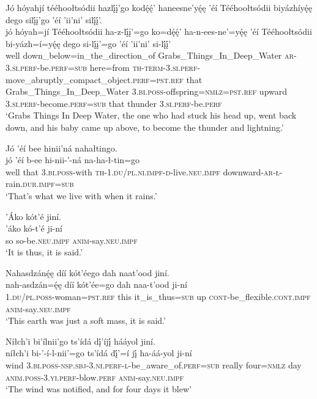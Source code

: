 \ea\label{ex:text4-7-6}
Jó hóyahjí tééhoołtsódii hazlį́į’go kodę́ę́’ haneesne’yę́ę ’éí Tééhoołtsódii biyázhíyę́ę dego silį́į’go ’éí ’ii’ni’ silį́į́’.\\
\gll jó	hóyah=jí	Tééhoołtsódii	ha-z-lį́į’=go	ko=dę́ę́’	ha-n-ees-ne’=yę́ę	’éí	Tééhoołtsódii	bi-yázh=í=yę́ę	dego	si-lį́į’=go	’éí	’ii’ni’	si-lį́į́’\\
     well	down\_below=in\_the\_direction\_of	Grabs\_Things\_In\_Deep\_Water	\textsc{ar}-3.\textsc{si}.\textsc{perf}-be.\textsc{perf}=\textsc{sub}	here=from	\textsc{th}-\textsc{term}-3.\textsc{si}.\textsc{perf}-move\_abruptly\_compact\_object.\textsc{perf}=\textsc{pst}.\textsc{ref}	that	Grabs\_Things\_In\_Deep\_Water	3.\textsc{bi}.\textsc{poss}-offspring=\textsc{nmlz}=\textsc{pst}.\textsc{ref}	upward	3.\textsc{si}.\textsc{perf}-become.\textsc{perf}=\textsc{sub}	that	thunder	3.\textsc{si}.\textsc{perf}-be.\textsc{perf}\\
\glt `Grabs Things In Deep Water, the one who had stuck his head up, went back down, and his baby came up above, to become the thunder and lightning.'
\z

\ea\label{ex:text4-7-7}
Jó ’éí bee hinii’ná nahałtingo.\\
\gll jó	’éí	b-ee	hi-nii-’-ná	na-ha-ł-tin=go\\
     well	that	3.\textsc{bi}.\textsc{poss}-with	\textsc{th}-1.\textsc{du}/\textsc{pl}.\textsc{ni}.\textsc{impf}-\textsc{d}-live.\textsc{neu}.\textsc{impf}	downward-\textsc{ar}-\textsc{ł}-rain.\textsc{dur}.\textsc{impf}=\textsc{sub}\\
\glt `That's what we live with when it rains.'
\z

\ea\label{ex:text4-7-8}
’Áko kót’é jiní.\\
\gll ’áko	kó-t’é	ji-ní\\
     so	so-be.\textsc{neu}.\textsc{impf}	\textsc{anim}-say.\textsc{neu}.\textsc{impf}\\
\glt `It is thus, it is said.'
\z

\ea\label{ex:text4-8-1}
Nahasdzánę́ę díí kót’éego dah naat’ood jiní.\\
\gll nah-asdzán=ę́ę	díí	kót’ée=go	dah	naa-t’ood	ji-ní\\
     1.\textsc{du}/\textsc{pl}.\textsc{poss}-woman=\textsc{pst}.\textsc{ref}	this	it\_is\_thus=\textsc{sub}	up	\textsc{cont}-be\_flexible.\textsc{cont}.\textsc{impf}	\textsc{anim}-say.\textsc{neu}.\textsc{impf}\\
\glt `This earth was just a soft mass, it is said.'
\z

\ea\label{ex:text4-8-2}
Níłch’i bi’ílnii’go ts’ídá dį́’íjį́ hááyol jiní.\\
\gll níłch’i	bi-’-í-l-nii’=go	ts’ídá	dį́’=í jį́	ha-áá-yol	ji-ní\\
     wind	3.\textsc{bi}.\textsc{poss}-\textsc{nsp}.\textsc{sbj}-3.\textsc{ni}.\textsc{perf}-\textsc{l}-be\_aware\_of.\textsc{perf}=\textsc{sub}	really	four=\textsc{nmlz}	day \textsc{anim}.\textsc{poss}-3.\textsc{yi}.\textsc{perf}-blow.\textsc{perf}	\textsc{anim}-say.\textsc{neu}.\textsc{impf}\\
\glt `The wind was notified, and for four days it blew'
\z

